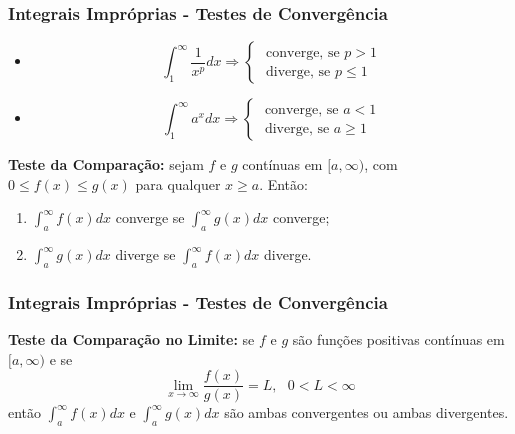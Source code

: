 \documentclass[hyperref={pdfpagelabels=false}]{beamer}
\begin{document}
\begin{frame}
\frametitle{Integrais Impróprias - Testes de Convergência}

\begin{itemize}
	\item $$\int_{1}^{\infty}\frac{1}{x^p}dx \Rightarrow \begin{cases}
		\text{ converge, se }p > 1 \\
		\text{ diverge, se } p \leq 1
	\end{cases}$$
	\item $$ \int_{1}^{\infty}a^x dx \Rightarrow \begin{cases}
	\text{ converge, se } a < 1 \\
	\text{ diverge, se } a \geq 1
	\end{cases}$$
\end{itemize}
\pause

{\bf Teste da Comparação:} sejam $f$ e $g$ contínuas em $[a,\infty)$, com $0 \leq f(x) \leq g(x) $ para qualquer $x \geq a$. Então:
\begin{enumerate}
	\item $\displaystyle \int_{a}^{\infty}f(x)dx$ converge se $\displaystyle \int_{a}^{\infty}g(x)dx$ converge;
	\item $\displaystyle \int_{a}^{\infty}g(x)dx$ diverge se $\displaystyle \int_{a}^{\infty}f(x)dx$ diverge.
\end{enumerate}


\end{frame}


\begin{frame}
\frametitle{Integrais Impróprias - Testes de Convergência}
{\bf Teste da Comparação no Limite:} se $f$ e $g$ são funções positivas contínuas em $[a,\infty)$ e se
$$\lim\limits_{x \rightarrow \infty}\frac{f(x)}{g(x)} = L, \text{   } 0 < L < \infty$$
então $\displaystyle \int_{a}^{\infty}f(x)dx$ e $\displaystyle \int_{a}^{\infty}g(x)dx$ são ambas convergentes ou ambas divergentes.


\end{frame}
\end{document}
